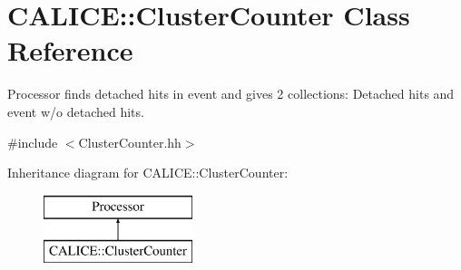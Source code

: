 \section{C\-A\-L\-I\-C\-E\-:\-:Cluster\-Counter Class Reference}
\label{classCALICE_1_1ClusterCounter}


Processor finds detached hits in event and gives 2 collections\-: Detached hits and event w/o detached hits.  




{\ttfamily \#include $<$Cluster\-Counter.\-hh$>$}

Inheritance diagram for C\-A\-L\-I\-C\-E\-:\-:Cluster\-Counter\-:\begin{figure}[H]
\begin{center}
\leavevmode
\includegraphics[height=2.000000cm]{classCALICE_1_1ClusterCounter}
\end{center}
\end{figure}
